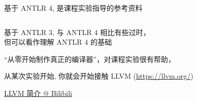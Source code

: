 \begin{frame}{}
  \begin{columns}
  \end{columns}

  \vspace{0.50cm}
  \begin{center}
    基于 ANTLR 4, 是课程实验指导的参考资料
  \end{center}
\end{frame}

\begin{frame}{}
  \begin{columns}
  \end{columns}

  \vspace{0.50cm}
  \begin{center}
    基于 ANTLR 3, 与 ANTLR 4 相比有些过时，\\[3pt]
    但可以看作理解 ANTLR 4 的基础
  \end{center}
\end{frame}

\begin{frame}{}
  \begin{center}
    ``从零开始制作真正的编译器''，对课程实验很有帮助，
  \end{center}
\end{frame}

\begin{frame}{}

  \begin{center}
    从某次实验开始, 你就会开始接触 LLVM (\url{https://llvm.org/})
  \end{center}
\end{frame}

\begin{frame}{}

  \vspace{0.20cm}
  \begin{center}
    \href{https://www.bilibili.com/video/BV1RF411K7F5/?vd_source=e3cbbf5ca80db268fa006d63626e267e}{LLVM 简介 @ Bilibili}
  \end{center}
\end{frame}


